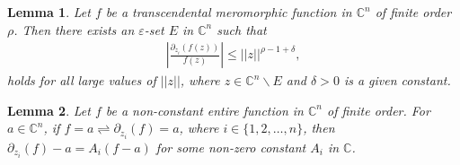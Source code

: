 \documentclass[10pt,a4paper]{amsart}
\newtheorem{lem}{Lemma}
\newcommand{\beas}{\begin{eqnarray*}}
\newcommand{\eeas}{\end{eqnarray*}}
\begin{document}
\begin{lem}\label{ln2.10}\cite{Majumder-Sarkar-2026} Let $f$ be a transcendental meromorphic function in $\mathbb{C}^n$ of finite order $\rho$. 
Then there exists an $\varepsilon$-set $E$ in $\mathbb{C}^n$ such that
\beas \displaystyle \left|\frac{\partial_{z_i}(f(z))}{f(z)}\right|\leq ||z||^{\rho-1+\delta},\eeas
holds for all large values of $||z||$, where $z\in \mathbb{C}^n\backslash E$ and $\delta>0$ is a given constant. 
\end{lem}

\begin{lem}\label{ln2.11} Let $f$ be a non-constant entire function in $\mathbb{C}^n$ of finite order. For $a\in\mathbb{C}^n$, if $f=a\rightleftharpoons \partial_{z_i}(f)=a$, where $i\in\{1,2,\ldots,n\}$, then $\partial_{z_i}(f)-a=A_i(f-a)$ for some non-zero constant $A_i$ in $\mathbb{C}$.
\end{lem}
\end{document}
